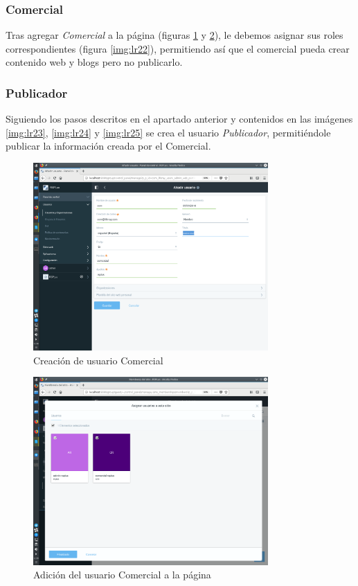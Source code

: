 \subsubsection{Comercial}
\par Tras agregar \textit{Comercial} a la página (figuras \ref{img:lr20} y \ref{img:lr21}), le debemos asignar sus roles correspondientes (figura \ref{img:lr22}), permitiendo así que el comercial pueda crear contenido web y blogs pero no publicarlo.
\subsubsection{Publicador}
\par Siguiendo los pasos descritos en el apartado anterior y contenidos en las imágenes \ref{img:lr23}, \ref{img:lr24} y \ref{img:lr25} se crea el usuario \textit{Publicador}, permitiéndole publicar la información creada por el Comercial.

\begin{figure}[H]
\begin{center}
\includegraphics[width=0.8\textwidth]{./img/liferay/20.png}
\end{center}
\caption{Creación de usuario Comercial}
\label{img:lr20}
\end{figure}

\begin{figure}[H]
\begin{center}
\includegraphics[width=0.8\textwidth]{./img/liferay/21.png}
\end{center}
\caption{Adición del usuario Comercial a la página}
\label{img:lr21}
\end{figure}

